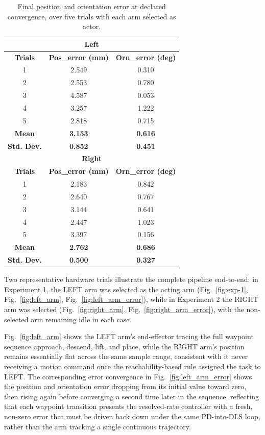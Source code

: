 \documentclass[letterpaper, 10 pt, conference]{ieeeconf}  %
\begin{document}
\begin{table}[htpb]
    \centering
    \renewcommand{\arraystretch}{1.4}
    \caption{Final position and orientation error at declared convergence, over five trials with each arm selected as actor.}
    \begin{tabular}{ccc}
        \hline
        \multicolumn{3}{c}{\textbf{Left}} \\
        \hline
        \textbf{Trials} & \textbf{Pos\_error (mm)} & \textbf{Orn\_error (deg)} \\
        \hline
        1 & 2.549 & 0.310 \\
        2 & 2.553 & 0.780 \\
        3 & 4.587 & 0.053 \\
        4 & 3.257 & 1.222 \\
        5 & 2.818 & 0.715 \\
        \hline
        \textbf{Mean} & \textbf{3.153} & \textbf{0.616} \\
        \textbf{Std. Dev.} & \textbf{0.852} & \textbf{0.451} \\
        \hline
        \multicolumn{3}{c}{\textbf{Right}} \\
        \hline
        \textbf{Trials} & \textbf{Pos\_error (mm)} & \textbf{Orn\_error (deg)} \\
        \hline
        1 & 2.183 & 0.842 \\
        2 & 2.640 & 0.767 \\
        3 & 3.144 & 0.641 \\
        4 & 2.447 & 1.023 \\
        5 & 3.397 & 0.156 \\
        \hline
        \textbf{Mean} & \textbf{2.762} & \textbf{0.686} \\
        \textbf{Std. Dev.} & \textbf{0.500} & \textbf{0.327} \\
        \hline
    \end{tabular}
    \label{error_metrics}
\end{table}
Two representative hardware trials illustrate the complete pipeline end-to-end: in Experiment 1, the LEFT arm was selected as the acting arm (Fig.~\ref{fig:exp-1}, Fig.~\ref{fig:left_arm}, Fig.~\ref{fig:left_arm_error}), while in Experiment 2 the RIGHT arm was selected (Fig.~\ref{fig:right_arm}, Fig.~\ref{fig:right_arm_error}), with the non-selected arm remaining idle in each case.

Fig.~\ref{fig:left_arm} shows the LEFT arm's end-effector tracing the full waypoint sequence approach,
descend, lift, and place, while the RIGHT arm's position remains essentially flat across the same sample range, consistent with it never receiving a motion command once the reachability-based rule assigned the task to LEFT. The corresponding error convergence in Fig.~\ref{fig:left_arm_error} shows the position and orientation error dropping from its initial value toward zero, then rising again before converging a second time later in the sequence, reflecting that each waypoint transition presents the resolved-rate controller with a fresh, non-zero error that must be driven back down under the same PD-into-DLS loop, rather than the arm tracking a single continuous trajectory.
\end{document}
